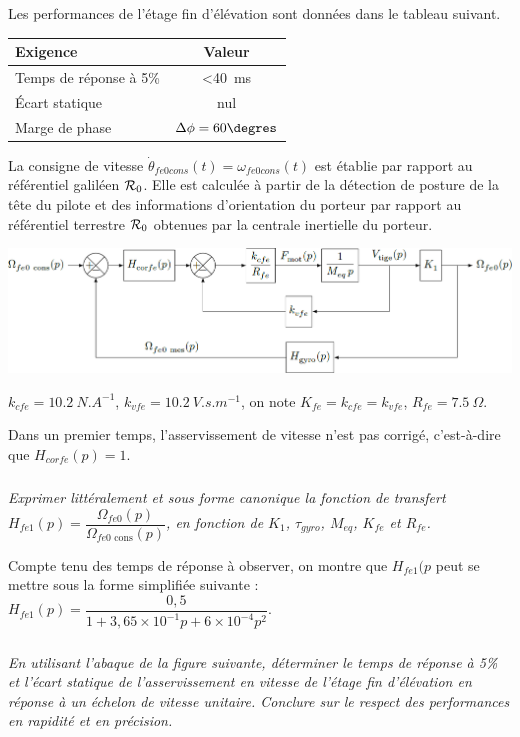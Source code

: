\documentclass[10pt,fleqn]{article} %
\begin{document}
\begin{multicols}{2}
Les performances de l’étage fin d’élévation sont données dans le tableau suivant. 
\begin{center}
\begin{tabular}{|l|c|}
\hline
\textbf{Exigence} & Valeur \\ \hline
Temps de réponse à 5\% & <\SI{40}{ms} \\ \hline
Écart statique & nul \\ \hline
Marge de phase & $\Delta \phi = 60\degres$ \\ \hline
\end{tabular}
\end{center}

La consigne de vitesse $\dot{\theta}_{fe0 cons}(t)= \omega_{fe0 cons}(t)$ est établie par rapport au référentiel galiléen $\mathcal{R}_{0}$. Elle est calculée à partir de la détection de posture  de la tête du pilote et des informations 
d’orientation du porteur par rapport au référentiel terrestre $\mathcal{R}_{0}$ obtenues par la centrale inertielle du porteur.


\begin{center}
\includegraphics[width=\linewidth]{images/fig_02}

$k_{cfe}=\SI{10,2}{N.A^{-1}}$, $k_{vfe}=\SI{10,2}{V.s.m^{-1}}$, on note 
$K_{fe}=k_{cfe}=k_{vfe}$, $R_{fe}=\SI{7,5}{\Omega}$. 
\end{center}

Dans un premier temps, l’asservissement de vitesse n’est pas corrigé, c’est-à-dire que $H_{cor fe}(p)=1$.


\subparagraph{}\textit{Exprimer littéralement et sous forme canonique la fonction de transfert $H_{fe1}(p)=\dfrac{\Omega_{fe0}(p)}{\Omega_{fe0\text{ cons}}(p)}$, en fonction de $K_1$, $\tau_{gyro}$, $M_{eq}$, $K_{fe}$ et $R_{fe}$.}

\ifprof
\begin{corrige}
\end{corrige}
\else
\fi
Compte tenu des temps de réponse à observer, on montre que $H_{fe1}(p$ peut se mettre sous la forme simplifiée suivante : $H_{fe1}(p)=\dfrac{0,5}{1+3,65\times 10^{-1}p+6\times 10^{-4}p^2}$.
\subparagraph{}\textit{En utilisant l’abaque de la figure suivante, déterminer le temps de réponse à 5\% et l’écart statique de l’asservissement en vitesse de l’étage fin d’élévation en réponse à un échelon de vitesse unitaire. Conclure sur le
respect des performances en rapidité et en précision.}
\ifprof
\begin{corrige}
\end{corrige}
\else
\fi



\end{multicols}
\end{document}
